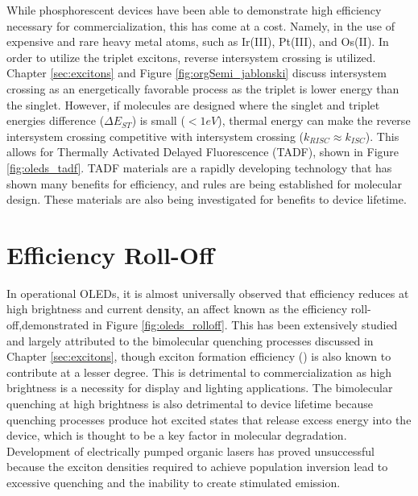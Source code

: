 \documentclass[../thesis.tex]{subfiles}
\begin{document}
While phosphorescent devices have been able to demonstrate high efficiency necessary for commercialization, this has come at a cost.
Namely, in the use of expensive and rare heavy metal atoms, such as Ir(III), Pt(III), and Os(II).\supercite{Adachi2001b}
In order to utilize the triplet excitons, reverse intersystem crossing is utilized.
Chapter \ref{sec:excitons} and Figure \ref{fig:orgSemi_jablonski} discuss intersystem crossing as an energetically favorable process as the triplet is lower energy than the singlet.
However, if molecules are designed where the singlet and triplet energies difference ($\Delta E_{ST}$) is small ($<1eV$), thermal energy can make the reverse intersystem crossing competitive with intersystem crossing ($k_{RISC}\approx k_{ISC}$).
This allows for Thermally Activated Delayed Fluorescence (TADF), shown in Figure \ref{fig:oleds_tadf}.\supercite{Zhang2012b,Zhang2014a,Uoyama2012}
TADF materials are a rapidly developing technology that has shown many benefits for efficiency, and rules are being established for molecular design.\supercite{Menke2016,Inoue2016,Li2013,Wang2015,Liu2015,Kim2015,Jankus2014,Lavie-Cambot2008,Zhang2012b,Endo2009,Yersin2014,Nasu2013,Uoyama2012,Zhang2012c,Hofbeck2015,Linfoot2014,Reineke2014a,Zhang2014a}
These materials are also being investigated for benefits to device lifetime.\supercite{Mehes2014,Cho2014}


\section{Efficiency Roll-Off}\label{sec:oleds_roll_off}

In operational OLEDs, it is almost universally observed that efficiency reduces at high brightness and current density, an affect known as the efficiency roll-off,demonstrated in Figure \ref{fig:oleds_rolloff}.\supercite{Erickson2014,Song2011,Wehrmeister2015,Son2008,Murawski2013,Giebink2008c,Song2010,Xiang2016,Coehoorn2015,Reineke2009,Mezyk2005,Baldo2000a,Reineke2007,Kohler2009,Hershey2016,Erickson2013a}
This has been extensively studied and largely attributed to the bimolecular quenching processes discussed in Chapter \ref{sec:excitons}, though exciton formation efficiency (\ef) is also known to contribute at a lesser degree.
This is detrimental to commercialization as high brightness is a necessity for display and lighting applications.
The bimolecular quenching at high brightness is also detrimental to device lifetime because quenching processes produce hot excited states that release excess energy into the device, which is thought to be a key factor in molecular degradation.\supercite{Giebink2008a,Coburn2017,Lee2017}
Development of electrically pumped organic lasers has proved unsuccessful because the exciton densities required to achieve population inversion lead to excessive quenching and the inability to create stimulated emission.\supercite{Baldo2002,Baldo1998a,Holmes2007,Takenobu2008,Samuel2009,Kasemann2011}
\end{document}
